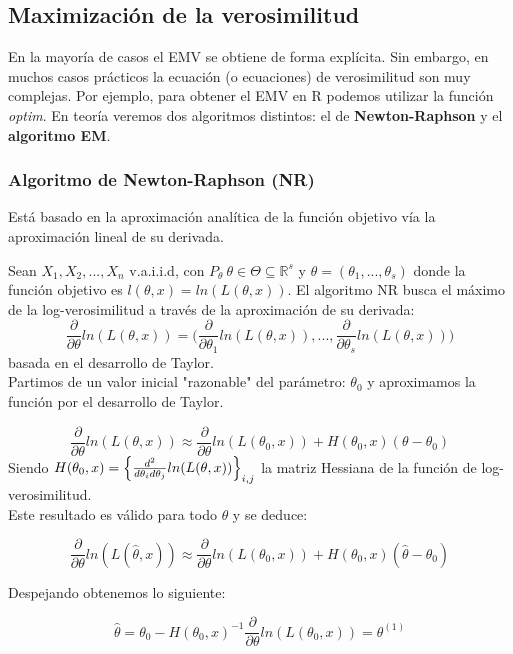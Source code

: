 \subsection{Maximización de la verosimilitud}

En la mayoría de casos el EMV se obtiene de forma explícita. Sin embargo, en muchos casos prácticos la ecuación (o ecuaciones) de verosimilitud son muy complejas.
Por ejemplo, para obtener el EMV en R podemos utilizar la función \textit{optim}. En teoría veremos dos algoritmos distintos: el de \textbf{Newton-Raphson} y el \textbf{algoritmo EM}. 

\subsubsection{Algoritmo de Newton-Raphson (NR)}

Está basado en la aproximación analítica de la función objetivo vía la aproximación lineal de su derivada.

Sean $X_1, X_2,...,X_n$ v.a.i.i.d, con $P_\theta\ \theta\in\Theta\subseteq \mathbb{R}^s$ y $\theta=(\theta_1,...,\theta_s)$ donde la función objetivo es $l(\theta,x)=ln(L(\theta,x))$.
El algoritmo NR busca el máximo de la log-verosimilitud a través de la aproximación de su derivada: 
$$\frac{\partial}{\partial\theta}ln(L(\theta,x))=\Big(\frac{\partial}{\partial\theta_1}ln(L(\theta,x)),...,\frac{\partial}{\partial\theta_s}ln(L(\theta,x))\Big)$$
basada en el desarrollo de Taylor.\\

Partimos de un valor inicial "razonable" del parámetro: $\theta_0$ y aproximamos la función por el desarrollo de Taylor.

$$\frac{\partial}{\partial\theta}ln(L(\theta,x))\approx\frac{\partial}{\partial\theta}ln(L(\theta_0,x))+H(\theta_0,x)(\theta-\theta_0)$$
Siendo $H(\theta_0,x)=\Big{\{}\frac{d^2}{d\theta_i d\theta_j}ln(L(\theta,x))\Big{\}}_{i,j}$ la matriz Hessiana de la función de log-verosimilitud. \\

Este resultado es válido para todo $\theta$ y se deduce:

$$\frac{\partial}{\partial\theta}ln(L(\widehat\theta,x))\approx\frac{\partial}{\partial\theta}ln(L(\theta_0,x))+H(\theta_0,x)(\widehat\theta-\theta_0)$$

Despejando obtenemos lo siguiente:

$$\widehat\theta=\theta_0-H(\theta_0,x)^{-1}\frac{\partial}{\partial\theta}ln(L(\theta_0,x))=\theta^{(1)}$$

